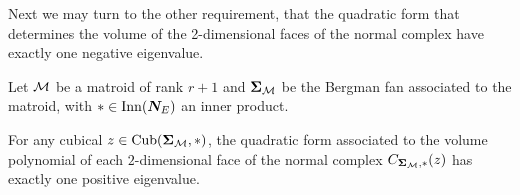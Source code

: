 \documentclass[12pt,oneside]{../../sfsuthesis}
\begin{document}
Next we may turn to the other requirement, that the quadratic form that determines the volume of the 2-dimensional faces of the normal complex have exactly one negative eigenvalue.

\begin{lemma}\th\label{thm:matroidNegEigen}

    Let \( \mathcal{M} \) be a matroid of rank \( r + 1 \) and \( \bm{\Sigma}_{\mathcal{M}} \) be the Bergman fan associated to the matroid, with \( \ast \in \mathrm{Inn}(\bm{N}_E) \) an inner product.

    For any cubical \( z \in \operatorname{Cub}(\bm{\Sigma}_{\mathcal{M}}, \ast) \), the quadratic form associated to the volume polynomial of each \( 2 \)-dimensional face of the normal complex \( C_{\bm{\Sigma}_{\mathcal{M}},\ast}(z) \)  has exactly one positive eigenvalue.

\end{lemma}
\end{document}
